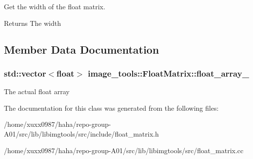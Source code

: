 Get the width of the float matrix. 

\begin{DoxyReturn}{Returns}
The width 
\end{DoxyReturn}


\subsection{Member Data Documentation}
\subsubsection[{\texorpdfstring{float\+\_\+array\+\_\+}{float_array_}}]{\setlength{\rightskip}{0pt plus 5cm}std\+::vector$<$float$>$ image\+\_\+tools\+::\+Float\+Matrix\+::float\+\_\+array\+\_\+\hspace{0.3cm}{\ttfamily [private]}}\hypertarget{classimage__tools_1_1FloatMatrix_a9e1cb78887534862b81fbf10a64ebfbf}{}\label{classimage__tools_1_1FloatMatrix_a9e1cb78887534862b81fbf10a64ebfbf}
The actual float array 

The documentation for this class was generated from the following files\+:\begin{DoxyCompactItemize}
\item 
/home/xuxx0987/haha/repo-\/group-\/\+A01/src/lib/libimgtools/src/include/float\+\_\+matrix.\+h\item 
/home/xuxx0987/haha/repo-\/group-\/\+A01/src/lib/libimgtools/src/float\+\_\+matrix.\+cc\end{DoxyCompactItemize}
